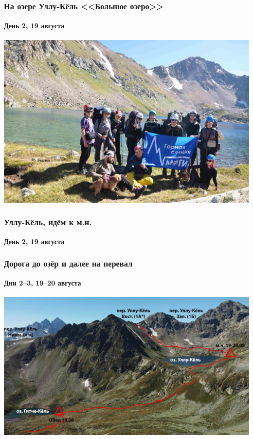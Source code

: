 \begin{frame}
	\frametitle{На озере Уллу-Кёль <<Большое озеро>>}
	\framesubtitle{День 2, 19 августа}
	\centering
	\includegraphics[width=\linewidth]{../pics/DSC_0800}
\end{frame}

\begin{frame}
	\frametitle{Уллу-Кёль, идём к м.н.}
	\framesubtitle{День 2, 19 августа}
	\centering
\end{frame}


\begin{frame}
	\frametitle{Дорога до озёр и далее на перевал}
	\framesubtitle{Дни 2--3, 19--20 августа}
	\centering
	\includegraphics[width=\linewidth]{../pics/ullu_kuel_route}
\end{frame}